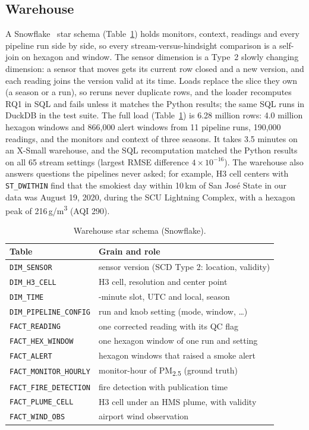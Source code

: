 \documentclass[10pt,journal,compsoc]{IEEEtran}
\newcommand{\ugm}{\,\textmu g/m\textsuperscript{3}}
\begin{document}
\subsection{Warehouse}
A Snowflake~\cite{dageville2016} star schema (Table~\ref{tab:schema}) holds monitors, context, readings and every pipeline run side by side, so every stream-versus-hindsight comparison is a self-join on hexagon and window. The sensor dimension is a Type~2 slowly changing dimension: a sensor that moves gets its current row closed and a new version, and each reading joins the version valid at its time. Loads replace the slice they own (a season or a run), so reruns never duplicate rows, and the loader recomputes RQ1 in SQL and fails unless it matches the Python results; the same SQL runs in DuckDB in the test suite. The full load (Table~\ref{tab:schema}) is 6.28 million rows: 4.0 million hexagon windows and 866,000 alert windows from 11 pipeline runs, 190,000 readings, and the monitors and context of three seasons. It takes 3.5 minutes on an X-Small warehouse, and the SQL recomputation matched the Python results on all 65 stream settings (largest RMSE difference $4\times10^{-16}$). The warehouse also answers questions the pipelines never asked; for example, H3 cell centers with \texttt{ST\_DWITHIN} find that the smokiest day within 10\,km of San Jos\'e State in our data was August 19, 2020, during the SCU Lightning Complex, with a hexagon peak of 216\ugm{} (AQI 290).

\begin{table}[t]
\caption{Warehouse star schema (Snowflake).}
\label{tab:schema}
\centering\scriptsize
\setlength{\tabcolsep}{3pt}
\begin{tabular}{>{\raggedright\arraybackslash}p{34mm}>{\raggedright\arraybackslash}p{48mm}}
\toprule
Table & Grain and role \\
\midrule
\texttt{DIM\_SENSOR} & sensor version (SCD Type 2: location, validity) \\
\texttt{DIM\_H3\_CELL} & H3 cell, resolution and center point \\
\texttt{DIM\_TIME} & 2-minute slot, UTC and local, season \\
\texttt{DIM\_PIPELINE\_CONFIG} & run and knob setting (mode, window, \dots) \\
\texttt{FACT\_READING} & one corrected reading with its QC flag \\
\texttt{FACT\_HEX\_WINDOW} & one hexagon window of one run and setting \\
\texttt{FACT\_ALERT} & hexagon windows that raised a smoke alert \\
\texttt{FACT\_MONITOR\_HOURLY} & monitor-hour of PM\textsubscript{2.5} (ground truth) \\
\texttt{FACT\_FIRE\_DETECTION} & fire detection with publication time \\
\texttt{FACT\_PLUME\_CELL} & H3 cell under an HMS plume, with validity \\
\texttt{FACT\_WIND\_OBS} & airport wind observation \\
\bottomrule
\end{tabular}
\end{table}
\end{document}
